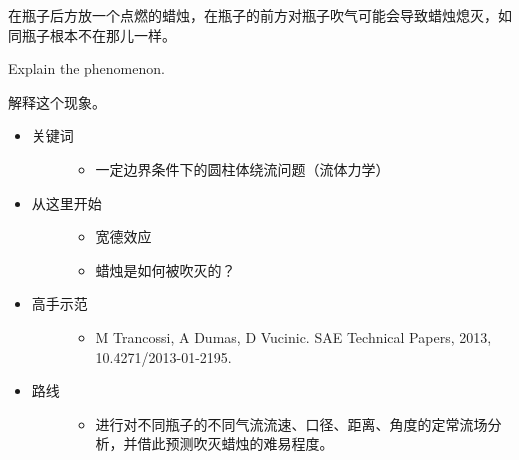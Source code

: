 \documentclass[a4paper,10pt,english]{sphinxmanual}
\begin{document}
在瓶子后方放一个点燃的蜡烛，在瓶子的前方对瓶子吹气可能会导致蜡烛熄灭，如同瓶子根本不在那儿一样。

Explain the phenomenon.

解释这个现象。
\begin{itemize}
\item {} \begin{description}
\item[{关键词}] \leavevmode\begin{itemize}
\item {} 
一定边界条件下的圆柱体绕流问题（流体力学）

\end{itemize}

\end{description}

\item {} \begin{description}
\item[{从这里开始}] \leavevmode\begin{itemize}
\item {} 
宽德效应 

\item {} 
蜡烛是如何被吹灭的？

\end{itemize}

\end{description}

\item {} \begin{description}
\item[{高手示范}] \leavevmode\begin{itemize}
\item {} 
M Trancossi, A Dumas, D Vucinic.  SAE Technical Papers, 2013, 10.4271/2013-01-2195.

\end{itemize}

\end{description}

\item {} \begin{description}
\item[{路线}] \leavevmode\begin{itemize}
\item {} 
进行对不同瓶子的不同气流流速、口径、距离、角度的定常流场分析，并借此预测吹灭蜡烛的难易程度。

\end{itemize}

\end{description}

\end{itemize}
\end{document}
